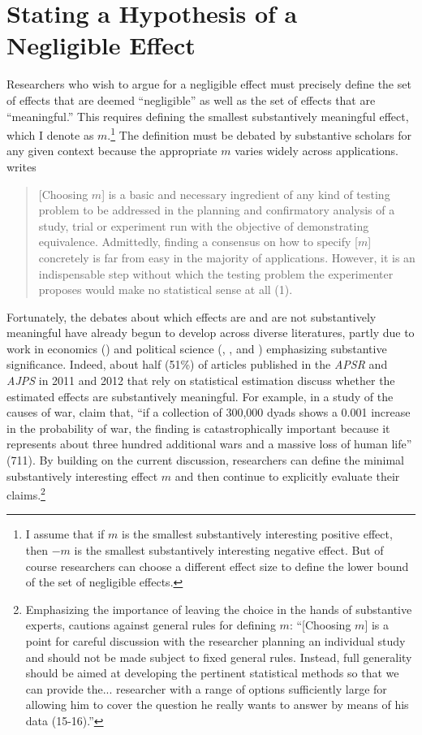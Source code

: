 \documentclass[12pt]{article}
\begin{document}
\section*{Stating a Hypothesis of a Negligible Effect}

Researchers  who wish to argue for a negligible effect must precisely define the set of effects that are deemed ``negligible'' as well as the set of effects that are  ``meaningful.'' This requires defining the smallest substantively meaningful effect, which I denote as $m$.\footnote{I assume that if $m$ is the smallest substantively interesting positive effect, then $-m$ is the smallest substantively interesting negative effect. But of course researchers can choose a different effect size to define the lower bound of the set of negligible effects.} The definition must be debated by substantive scholars for any given context because the appropriate $m$ varies widely across applications.  \cite{Wellek2010} writes
\begin{quote}
[Choosing $m$] is a basic and necessary ingredient of any kind of testing problem to be addressed in the planning and confirmatory analysis of a study, trial or experiment run with the objective of demonstrating equivalence. Admittedly, finding a consensus on how to specify [$m$] concretely is far from easy in the majority of applications. However, it is an indispensable step without which the testing problem the experimenter proposes would make no statistical sense at all (1).
\end{quote}

Fortunately, the debates about which effects are and are not substantively meaningful have already begun to develop across diverse literatures, partly due to work in economics (\citealt{McCloskeyZiliak2008}) and political science (\citealt{Achen1982}, \citealt{EsareyDanneman2013}, and \citealt{Gross2013}) emphasizing substantive significance. Indeed, about half (51\%) of articles published in the \textit{APSR} and \textit{AJPS} in 2011 and 2012 that rely on statistical estimation discuss whether the estimated effects are substantively meaningful. For example, in a study of the causes of war, \cite{KingZeng2001} claim that, ``if a collection of 300,000 dyads shows a 0.001 increase in the probability of war, the finding is catastrophically important because it represents about three hundred additional wars and a massive loss of human life'' (711). By building on the current discussion, researchers can define the minimal substantively interesting effect $m$ and then continue to explicitly evaluate their claims.\footnote{Emphasizing the importance of leaving the choice in the hands of substantive experts, \citeauthor{Wellek2010} cautions against general rules for defining $m$:  ``[Choosing $m$] is a point for careful discussion with the researcher planning an individual study and should not be made subject to fixed general rules. Instead, full generality should be aimed at developing the pertinent statistical methods so that we can provide the... researcher with a range of options sufficiently large for allowing him to cover the question he really wants to answer by means of his data (15-16).''}  
\end{document}
